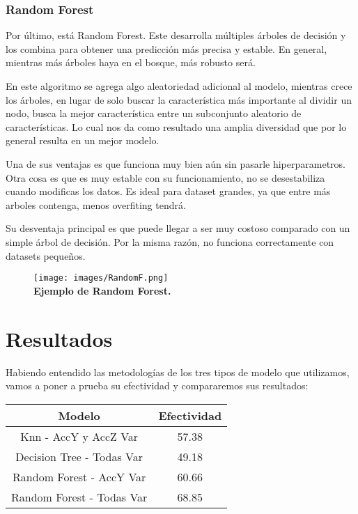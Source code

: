 \documentclass{article}
\begin{document}
        \subsubsection{Random Forest}

            Por último, está Random Forest. Este desarrolla múltiples árboles de decisión y los combina para obtener una predicción más precisa y estable. En general, mientras más árboles haya en el bosque, más robusto será.

            En este algoritmo se agrega algo aleatoriedad adicional al modelo, mientras crece los árboles, en lugar de solo buscar la característica más importante al dividir un nodo, busca la mejor característica entre un subconjunto aleatorio de características. Lo cual nos da como resultado una amplia diversidad que por lo general resulta en un mejor modelo.
    
            Una de sus ventajas es que funciona muy bien aún sin pasarle hiperparametros. Otra cosa es que es muy estable con su funcionamiento, no se desestabiliza cuando modificas los datos. Es ideal para dataset grandes, ya que entre más arboles contenga, menos overfiting tendrá.
    
            Su desventaja principal es que puede llegar a ser muy costoso comparado con un simple árbol de decisión. Por la misma razón, no funciona correctamente con datasets pequeños. \\

            \begin{figure}[ht]
            \centering
                \texttt{[image: images/RandomF.png]} \\
                \textbf{Ejemplo de Random Forest.} \\
            \end{figure}

\section{Resultados}

Habiendo entendido las metodologías de los tres tipos de modelo que utilizamos, vamos a poner a prueba su efectividad y compararemos sus resultados:

    \begin{center}
    \begin{tabular}{||c c||} 
     \hline
     Modelo & Efectividad \\ [0.5ex] 
     \hline\hline
     Knn - AccY y AccZ Var & 57.38 \\ 
     \hline
     Decision Tree - Todas Var & 49.18 \\
     \hline
     Random Forest - AccY Var & 60.66 \\
     \hline
     Random Forest - Todas Var & 68.85 \\
     \hline
    \end{tabular}
    \end{center}
\end{document}
